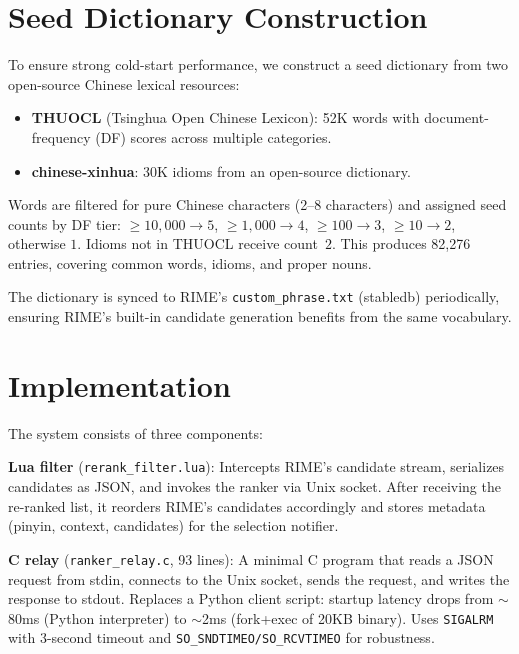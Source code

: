\documentclass[11pt]{article}
\begin{document}
\section{Seed Dictionary Construction}

To ensure strong cold-start performance, we construct a seed dictionary from
two open-source Chinese lexical resources:

\begin{itemize}[nosep]
\item \textbf{THUOCL} (Tsinghua Open Chinese Lexicon): 52K words with
  document-frequency (DF) scores across multiple categories.
\item \textbf{chinese-xinhua}: 30K idioms from an open-source dictionary.
\end{itemize}

Words are filtered for pure Chinese characters (2--8 characters) and assigned
seed counts by DF tier: $\geq 10{,}000 \rightarrow 5$, $\geq 1{,}000
\rightarrow 4$, $\geq 100 \rightarrow 3$, $\geq 10 \rightarrow 2$, otherwise
$1$. Idioms not in THUOCL receive count~$2$. This produces 82,276 entries,
covering common words, idioms, and proper nouns.

The dictionary is synced to RIME's \texttt{custom\_phrase.txt} (stabledb)
periodically, ensuring RIME's built-in candidate generation benefits from the
same vocabulary.

\section{Implementation}

The system consists of three components:

\textbf{Lua filter} (\texttt{rerank\_filter.lua}): Intercepts RIME's candidate
stream, serializes candidates as JSON, and invokes the ranker via Unix socket.
After receiving the re-ranked list, it reorders RIME's candidates accordingly
and stores metadata (pinyin, context, candidates) for the selection notifier.

\textbf{C relay} (\texttt{ranker\_relay.c}, 93 lines): A minimal C program that
reads a JSON request from stdin, connects to the Unix socket, sends the
request, and writes the response to stdout. Replaces a Python client script:
startup latency drops from $\sim$80ms (Python interpreter) to $\sim$2ms
(fork+exec of 20KB binary). Uses \texttt{SIGALRM} with 3-second timeout and
\texttt{SO\_SNDTIMEO/SO\_RCVTIMEO} for robustness.
\end{document}
